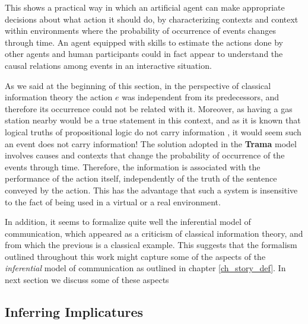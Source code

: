 \documentclass[
		twoside,openright,titlepage,numbers=noenddot,manychapters,
		headinclude,%
                footinclude=false,cleardoublepage=empty,
                BCOR=5mm,
		fontsize=11pt, %
                 enabledeprecatedfontcommands]{scrreprt}
\begin{document}
This shows a practical way in which an artificial agent can make appropriate decisions about what action it should do, by characterizing contexts and context within environments where the probability of occurrence of events changes through time. An agent equipped with skills to estimate the actions done by other agents and human participants could in fact appear to understand the causal relations among events in an interactive situation. 

As we said at the beginning of this section, in the perspective of classical information theory the action $e$ was independent from its predecessors, and therefore its occurrence could not be related with it. Moreover, as having a gas station nearby would be a true statement in this context, and as it is known that logical truths of propositional logic do not carry information \cite[]{bremer2003ltc}, it would seem such an event does not carry information! The solution adopted in the \textbf{Trama} model involves causes and contexts that change the probability of occurrence of the events through time. Therefore, the information is associated with the performance of the action itself, independently of the truth of the sentence conveyed by the action. This has the advantage that such a system is insensitive to the fact of being used in a virtual or a real environment. 





In addition, it seems to formalize quite well the inferential model of communication, which appeared as a criticism of classical information theory, and from which the previous is a classical example. %
This suggests that the formalism outlined throughout this work might capture some of the aspects of the \emph{inferential} model of communication as outlined in  chapter \ref{ch_story_def}. In next section we discuss some of these aspects %



\subsection{Inferring Implicatures}
\end{document}
